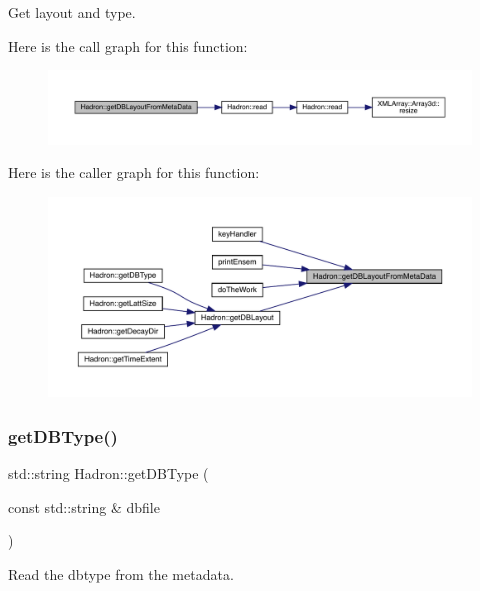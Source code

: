 Get layout and type. 

Here is the call graph for this function\+:
\nopagebreak
\begin{figure}[H]
\begin{center}
\leavevmode
\includegraphics[width=350pt]{d1/daf/namespaceHadron_a5f888183d0cbdadea2ebdf51020f5042_cgraph}
\end{center}
\end{figure}
Here is the caller graph for this function\+:
\nopagebreak
\begin{figure}[H]
\begin{center}
\leavevmode
\includegraphics[width=350pt]{d1/daf/namespaceHadron_a5f888183d0cbdadea2ebdf51020f5042_icgraph}
\end{center}
\end{figure}
\mbox{\label{namespaceHadron_a82284ec1545a1a6b6794da8d973a1d57}} 
\subsubsection{\texorpdfstring{getDBType()}{getDBType()}}
{\footnotesize\ttfamily std\+::string Hadron\+::get\+D\+B\+Type (\begin{DoxyParamCaption}\item[{const std\+::string \&}]{dbfile }\end{DoxyParamCaption})}



Read the dbtype from the metadata. 

